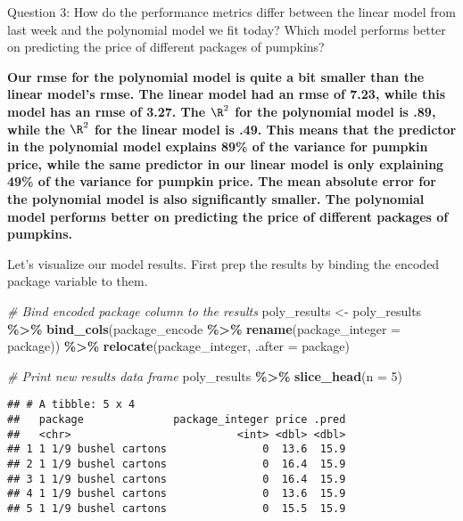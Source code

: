 \documentclass[
]{article}
\newenvironment{Shaded}{\begin{snugshade}}{\end{snugshade}}
\newcommand{\AttributeTok}[1]{\textcolor[rgb]{0.13,0.29,0.53}{#1}}
\newcommand{\CommentTok}[1]{\textcolor[rgb]{0.56,0.35,0.01}{\textit{#1}}}
\newcommand{\DecValTok}[1]{\textcolor[rgb]{0.00,0.00,0.81}{#1}}
\newcommand{\FunctionTok}[1]{\textcolor[rgb]{0.13,0.29,0.53}{\textbf{#1}}}
\newcommand{\NormalTok}[1]{#1}
\newcommand{\OtherTok}[1]{\textcolor[rgb]{0.56,0.35,0.01}{#1}}
\newcommand{\SpecialCharTok}[1]{\textcolor[rgb]{0.81,0.36,0.00}{\textbf{#1}}}
\begin{document}
Question 3: How do the performance metrics differ between the linear
model from last week and the polynomial model we fit today? Which model
performs better on predicting the price of different packages of
pumpkins?

\textbf{Our rmse for the polynomial model is quite a bit smaller than
the linear model's rmse. The linear model had an rmse of 7.23, while
this model has an rmse of 3.27. The \(\R^2\) for the polynomial model is
.89, while the \(\R^2\) for the linear model is .49. This means that the
predictor in the polynomial model explains 89\% of the variance for
pumpkin price, while the same predictor in our linear model is only
explaining 49\% of the variance for pumpkin price. The mean absolute
error for the polynomial model is also significantly smaller. The
polynomial model performs better on predicting the price of different
packages of pumpkins.}

Let's visualize our model results. First prep the results by binding the
encoded package variable to them.

\begin{Shaded}
\begin{Highlighting}[]
\CommentTok{\# Bind encoded package column to the results}
\NormalTok{poly\_results }\OtherTok{\textless{}{-}}\NormalTok{ poly\_results }\SpecialCharTok{\%\textgreater{}\%} 
  \FunctionTok{bind\_cols}\NormalTok{(package\_encode }\SpecialCharTok{\%\textgreater{}\%} 
              \FunctionTok{rename}\NormalTok{(}\AttributeTok{package\_integer =}\NormalTok{ package)) }\SpecialCharTok{\%\textgreater{}\%} 
  \FunctionTok{relocate}\NormalTok{(package\_integer, }\AttributeTok{.after =}\NormalTok{ package)}


\CommentTok{\# Print new results data frame}
\NormalTok{poly\_results }\SpecialCharTok{\%\textgreater{}\%} 
  \FunctionTok{slice\_head}\NormalTok{(}\AttributeTok{n =} \DecValTok{5}\NormalTok{)}
\end{Highlighting}
\end{Shaded}

\begin{verbatim}
## # A tibble: 5 x 4
##   package              package_integer price .pred
##   <chr>                          <int> <dbl> <dbl>
## 1 1 1/9 bushel cartons               0  13.6  15.9
## 2 1 1/9 bushel cartons               0  16.4  15.9
## 3 1 1/9 bushel cartons               0  16.4  15.9
## 4 1 1/9 bushel cartons               0  13.6  15.9
## 5 1 1/9 bushel cartons               0  15.5  15.9
\end{verbatim}
\end{document}
